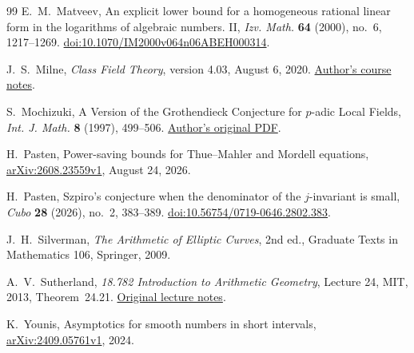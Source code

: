 \documentclass[11pt]{amsart}
\theoremstyle{definition}
\theoremstyle{remark}
\begin{document}
\begin{thebibliography}{99}
E.~M.~Matveev, An explicit lower bound for a homogeneous rational linear
form in the logarithms of algebraic numbers. II,
\emph{Izv. Math.} \textbf{64} (2000), no.~6, 1217--1269.
\href{https://doi.org/10.1070/IM2000v064n06ABEH000314}{doi:10.1070/IM2000v064n06ABEH000314}.

J.~S.~Milne, \emph{Class Field Theory}, version 4.03, August 6, 2020.
\href{https://www.jmilne.org/math/CourseNotes/CFT.pdf}{Author's course notes}.

S.~Mochizuki, A Version of the Grothendieck Conjecture for $p$-adic
Local Fields, \emph{Int. J. Math.} \textbf{8} (1997), 499--506.
\href{https://www.kurims.kyoto-u.ac.jp/~motizuki/A%20Version%20of%20the%20Grothendieck%20Conjecture%20for%20p-adic%20Local%20Fields.pdf}{Author's original PDF}.

H.~Pasten, Power-saving bounds for Thue--Mahler and Mordell equations,
\href{https://arxiv.org/abs/2608.23559v1}{arXiv:2608.23559v1}, August 24, 2026.

H.~Pasten, Szpiro's conjecture when the denominator of the $j$-invariant
is small, \emph{Cubo} \textbf{28} (2026), no.~2, 383--389.
\href{https://doi.org/10.56754/0719-0646.2802.383}{doi:10.56754/0719-0646.2802.383}.

J.~H.~Silverman, \emph{The Arithmetic of Elliptic Curves},
2nd ed., Graduate Texts in Mathematics 106, Springer, 2009.

A.~V.~Sutherland, \emph{18.782 Introduction to Arithmetic Geometry},
Lecture 24, MIT, 2013, Theorem~24.21.
\href{https://math.mit.edu/classes/18.782/2013fa/LectureNotes24.pdf}{Original lecture notes}.

K.~Younis, Asymptotics for smooth numbers in short intervals,
\href{https://arxiv.org/abs/2409.05761v1}{arXiv:2409.05761v1}, 2024.

\end{thebibliography}
\end{document}

